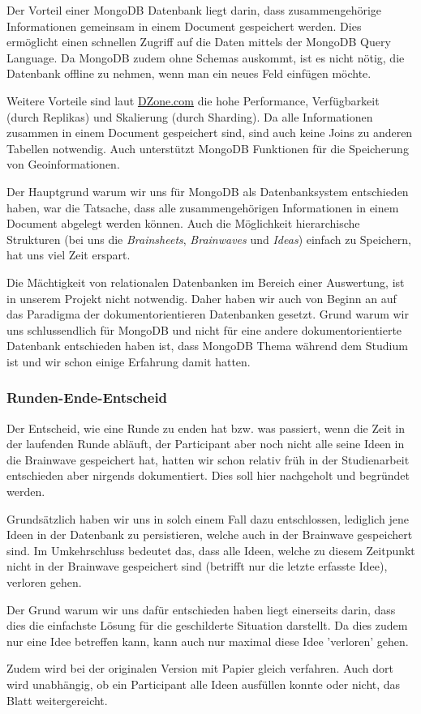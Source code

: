 Der Vorteil einer MongoDB Datenbank liegt darin, dass zusammengehörige Informationen gemeinsam in einem Document gespeichert werden. Dies ermöglicht einen schnellen Zugriff auf die Daten mittels der MongoDB Query Language. Da MongoDB zudem ohne Schemas auskommt, ist es nicht nötig, die Datenbank offline zu nehmen, wenn man ein neues Feld einfügen möchte.

Weitere Vorteile sind laut \href{DZone.com}{DZone.com} die hohe Performance, Verfügbarkeit (durch Replikas) und Skalierung (durch Sharding). Da alle Informationen zusammen in einem Document gespeichert sind, sind auch keine Joins zu anderen Tabellen notwendig. Auch unterstützt MongoDB Funktionen für die Speicherung von Geoinformationen.

Der Hauptgrund warum wir uns für MongoDB als Datenbanksystem entschieden haben, war die Tatsache, dass alle zusammengehörigen Informationen in einem Document abgelegt werden können. Auch die Möglichkeit hierarchische Strukturen (bei uns die \textit{Brainsheets}, \textit{Brainwaves} und \textit{Ideas}) einfach zu Speichern, hat uns viel Zeit erspart.

Die Mächtigkeit von relationalen Datenbanken im Bereich einer Auswertung, ist in unserem Projekt nicht notwendig. Daher haben wir auch von Beginn an auf das Paradigma der dokumentorientieren Datenbanken gesetzt. Grund warum wir uns schlussendlich für MongoDB und nicht für eine andere dokumentorientierte Datenbank entschieden haben ist, dass MongoDB Thema während dem Studium ist und wir schon einige Erfahrung damit hatten.

\subsubsection{Runden-Ende-Entscheid}
Der Entscheid, wie eine Runde zu enden hat bzw. was passiert, wenn die Zeit in der laufenden Runde abläuft, der Participant aber noch nicht alle seine Ideen in die Brainwave gespeichert hat, hatten wir schon relativ früh in der Studienarbeit entschieden aber nirgends dokumentiert. Dies soll hier nachgeholt und begründet werden.

Grundsätzlich haben wir uns in solch einem Fall dazu entschlossen, lediglich jene Ideen in der Datenbank zu persistieren, welche auch in der Brainwave gespeichert sind. Im Umkehrschluss bedeutet das, dass alle Ideen, welche zu diesem Zeitpunkt nicht in der Brainwave gespeichert sind (betrifft nur die letzte erfasste Idee), verloren gehen. 

Der Grund warum wir uns dafür entschieden haben liegt einerseits darin, dass dies die einfachste Lösung für die geschilderte Situation darstellt. Da dies zudem nur eine Idee betreffen kann, kann auch nur maximal diese Idee 'verloren' gehen. 

Zudem wird bei der originalen Version mit Papier gleich verfahren. Auch dort wird unabhängig, ob ein Participant alle Ideen ausfüllen konnte oder nicht, das Blatt weitergereicht. 